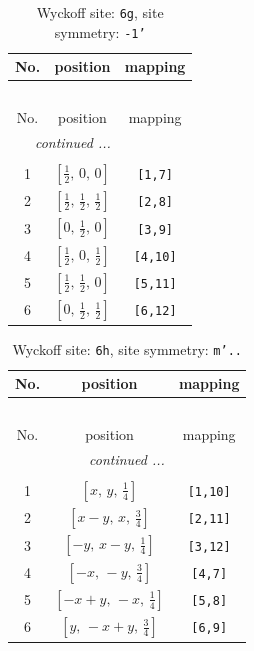 \documentclass[fleqn,8pt]{jsarticle}
\begin{document}
\renewcommand{\arraystretch}{1.2}
\begin{longtable}{ccc}
\caption{Wyckoff site: {\tt 6g}, site symmetry: {\tt -1'}}
 \\
 \hline \hline
No. & position & mapping \\ \hline \endfirsthead

\multicolumn{2}{l}{\tablename\ \thetable{}} \\
 \hline \hline
No. & position & mapping \\ \hline \endhead

 \hline \hline
\multicolumn{2}{r}{\footnotesize\it continued ...} \\ \endfoot

 \hline \hline
\multicolumn{2}{r}{} \\ \endlastfoot

1 & $\left[ \frac{1}{2},\, 0,\, 0 \right]$ & {\tt [1,7]} \\ \hline
2 & $\left[ \frac{1}{2},\, \frac{1}{2},\, \frac{1}{2} \right]$ & {\tt [2,8]} \\ \hline
3 & $\left[ 0,\, \frac{1}{2},\, 0 \right]$ & {\tt [3,9]} \\ \hline
4 & $\left[ \frac{1}{2},\, 0,\, \frac{1}{2} \right]$ & {\tt [4,10]} \\ \hline
5 & $\left[ \frac{1}{2},\, \frac{1}{2},\, 0 \right]$ & {\tt [5,11]} \\ \hline
6 & $\left[ 0,\, \frac{1}{2},\, \frac{1}{2} \right]$ & {\tt [6,12]} \\
\end{longtable}
\renewcommand{\arraystretch}{1.2}
\begin{longtable}{ccc}
\caption{Wyckoff site: {\tt 6h}, site symmetry: {\tt m'..}}
 \\
 \hline \hline
No. & position & mapping \\ \hline \endfirsthead

\multicolumn{2}{l}{\tablename\ \thetable{}} \\
 \hline \hline
No. & position & mapping \\ \hline \endhead

 \hline \hline
\multicolumn{2}{r}{\footnotesize\it continued ...} \\ \endfoot

 \hline \hline
\multicolumn{2}{r}{} \\ \endlastfoot

1 & $\left[ x,\, y,\, \frac{1}{4} \right]$ & {\tt [1,10]} \\ \hline
2 & $\left[ x - y,\, x,\, \frac{3}{4} \right]$ & {\tt [2,11]} \\ \hline
3 & $\left[ - y,\, x - y,\, \frac{1}{4} \right]$ & {\tt [3,12]} \\ \hline
4 & $\left[ - x,\, - y,\, \frac{3}{4} \right]$ & {\tt [4,7]} \\ \hline
5 & $\left[ - x + y,\, - x,\, \frac{1}{4} \right]$ & {\tt [5,8]} \\ \hline
6 & $\left[ y,\, - x + y,\, \frac{3}{4} \right]$ & {\tt [6,9]} \\
\end{longtable}
\end{document}
